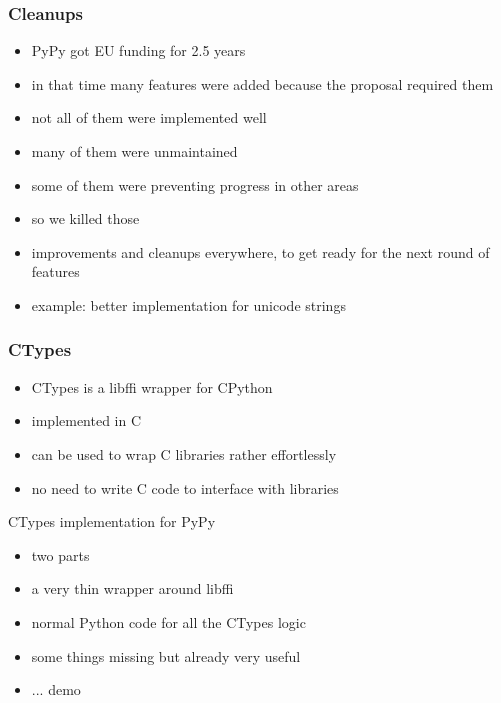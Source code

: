 \documentclass[utf8x]{beamer}
\begin{document}
\begin{frame}
  \frametitle{Cleanups}
  \begin{itemize}
  \item PyPy got EU funding for 2.5 years
  \item in that time many features were added because the proposal required them
  \item not all of them were implemented well
  \item many of them were unmaintained
  \item some of them were preventing progress in other areas
  \item so we killed those
  \item improvements and cleanups everywhere, to get ready for the next round of features
  \item example: better implementation for unicode strings
  \end{itemize}
\end{frame}

\begin{frame}
  \frametitle{CTypes}
  \begin{itemize}
  \item CTypes is a libffi wrapper for CPython
  \item implemented in C
  \item can be used to wrap C libraries rather effortlessly
  \item no need to write C code to interface with libraries
  
  \end{itemize}
  \pause
  \begin{block}{
    CTypes implementation for PyPy}
    \begin{itemize}
    \item two parts
    \item a very thin wrapper around libffi
    \item normal Python code for all the CTypes logic
    \item some things missing but already very useful
    \item ... demo
    \end{itemize}
  \end{block}
\end{frame}
\end{document}
